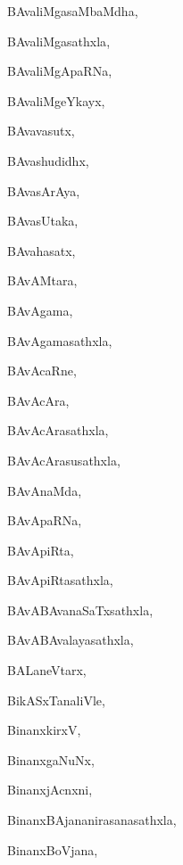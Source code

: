 \begin{multicols}{3}
{\noindent
{BAvaliMgasaMbaMdha}, \pageref{BAvaliMgasaMbaMdha}

\noindent
{BAvaliMgasathxla}, \pageref{BAvaliMgasathxla}

\noindent
{BAvaliMgApaRNa}, \pageref{BAvaliMgApaRNa}

\noindent
{BAvaliMgeYkayx}, \pageref{BAvaliMgeYkayx}

\noindent
{BAvavasutx}, \pageref{BAvavasutx}

\noindent
{BAvashudidhx}, \pageref{BAvashudidhx}

\noindent
{BAvasArAya}, \pageref{BAvasArAya}

\noindent
{BAvasUtaka}, \pageref{BAvasUtaka}

\noindent
{BAvahasatx}, \pageref{BAvahasatx}

\noindent
{BAvAMtara}, \pageref{BAvAMtara}

\noindent
{BAvAgama}, \pageref{BAvAgama}

\noindent
{BAvAgamasathxla}, \pageref{BAvAgamasathxla}

\noindent
{BAvAcaRne}, \pageref{BAvAcaRne}

\noindent
{BAvAcAra}, \pageref{BAvAcAra}

\noindent
{BAvAcArasathxla}, \pageref{BAvAcArasathxla}

\noindent
{BAvAcArasusathxla}, \pageref{BAvAcArasusathxla}

\noindent
{BAvAnaMda}, \pageref{BAvAnaMda}

\noindent
{BAvApaRNa}, \pageref{BAvApaRNa}

\noindent
{BAvApiRta}, \pageref{BAvApiRta}

\noindent
{BAvApiRtasathxla}, \pageref{BAvApiRtasathxla}

\noindent
{BAvABAvanaSaTxsathxla}, \pageref{BAvABAvanaSaTxsathxla}

\noindent
{BAvABAvalayasathxla}, \pageref{BAvABAvalayasathxla}

\noindent
{BALaneVtarx}, \pageref{BALaneVtarx}

\noindent
{BikASxTanaliVle}, \pageref{BikASxTanaliVle}

\noindent
{BinanxkirxV}, \pageref{BinanxkirxV}

\noindent
{BinanxgaNuNx}, \pageref{BinanxgaNuNx}

\noindent
{BinanxjAcnxni}, \pageref{BinanxjAcnxni}

\noindent
{BinanxBAjananirasanasathxla}, \pageref{BinanxBAjananirasanasathxla}

\noindent
{BinanxBoVjana}, \pageref{BinanxBoVjana}

}
\end{multicols}
